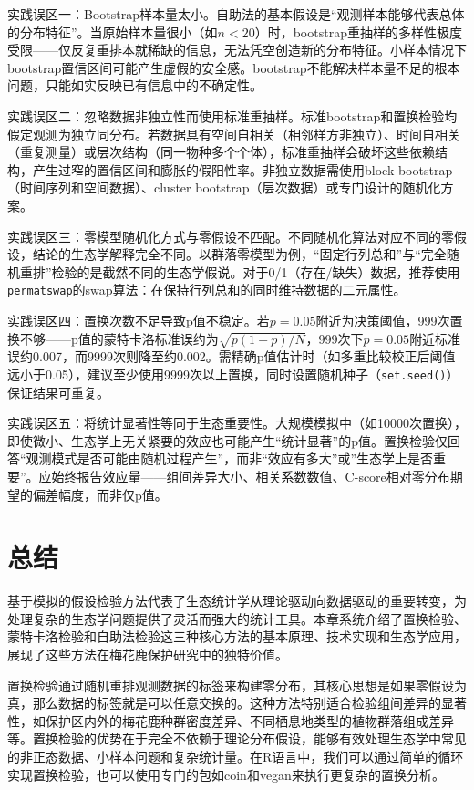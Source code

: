 \documentclass[
  twoside,12pt,fontset=none]{ctexbook}
\begin{document}
实践误区一：Bootstrap样本量太小。自助法的基本假设是``观测样本能够代表总体的分布特征''。当原始样本量很小（如\(n < 20\)）时，bootstrap重抽样的多样性极度受限------仅反复重排本就稀缺的信息，无法凭空创造新的分布特征。小样本情况下bootstrap置信区间可能产生虚假的安全感。bootstrap不能解决样本量不足的根本问题，只能如实反映已有信息中的不确定性。

实践误区二：忽略数据非独立性而使用标准重抽样。标准bootstrap和置换检验均假定观测为独立同分布。若数据具有空间自相关（相邻样方非独立）、时间自相关（重复测量）或层次结构（同一物种多个个体），标准重抽样会破坏这些依赖结构，产生过窄的置信区间和膨胀的假阳性率。非独立数据需使用block bootstrap（时间序列和空间数据）、cluster bootstrap（层次数据）或专门设计的随机化方案。

实践误区三：零模型随机化方式与零假设不匹配。不同随机化算法对应不同的零假设，结论的生态学解释完全不同。以群落零模型为例，``固定行列总和''与``完全随机重排''检验的是截然不同的生态学假说。对于0/1（存在/缺失）数据，推荐使用\texttt{permatswap}的swap算法：在保持行列总和的同时维持数据的二元属性。

实践误区四：置换次数不足导致p值不稳定。若\(p = 0.05\)附近为决策阈值，999次置换不够------p值的蒙特卡洛标准误约为\(\sqrt{p(1-p)/N}\)，999次下\(p = 0.05\)附近标准误约0.007，而9999次则降至约0.002。需精确p值估计时（如多重比较校正后阈值远小于0.05），建议至少使用9999次以上置换，同时设置随机种子（\texttt{set.seed()}）保证结果可重复。

实践误区五：将统计显著性等同于生态重要性。大规模模拟中（如10000次置换），即使微小、生态学上无关紧要的效应也可能产生``统计显著''的p值。置换检验仅回答``观测模式是否可能由随机过程产生''，而非``效应有多大''或''生态学上是否重要''。应始终报告效应量------组间差异大小、相关系数数值、C-score相对零分布期望的偏差幅度，而非仅p值。

\hypertarget{ux603bux7ed3-6}{%
\section{总结}\label{ux603bux7ed3-6}}

基于模拟的假设检验方法代表了生态统计学从理论驱动向数据驱动的重要转变，为处理复杂的生态学问题提供了灵活而强大的统计工具。本章系统介绍了置换检验、蒙特卡洛检验和自助法检验这三种核心方法的基本原理、技术实现和生态学应用，展现了这些方法在梅花鹿保护研究中的独特价值。

置换检验通过随机重排观测数据的标签来构建零分布，其核心思想是如果零假设为真，那么数据的标签就是可以任意交换的。这种方法特别适合检验组间差异的显著性，如保护区内外的梅花鹿种群密度差异、不同栖息地类型的植物群落组成差异等。置换检验的优势在于完全不依赖于理论分布假设，能够有效处理生态学中常见的非正态数据、小样本问题和复杂统计量。在R语言中，我们可以通过简单的循环实现置换检验，也可以使用专门的包如coin和vegan来执行更复杂的置换分析。
\end{document}
